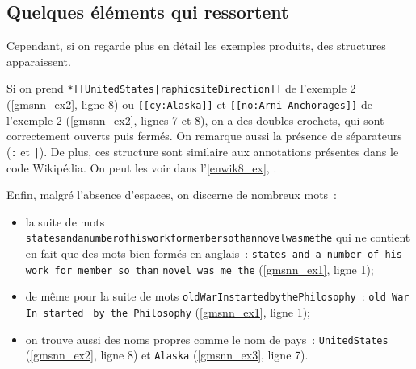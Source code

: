 \subsection{Quelques éléments qui ressortent}
Cependant, si on regarde plus en détail les exemples produits, des structures apparaissent. 

Si on prend \lstinline!*[[UnitedStates|raphicsiteDirection]]! de l'exemple 2 (\autoref{gmsnn_ex2}, ligne 8) ou 
\lstinline![[cy:Alaska]]! et \lstinline![[no:Arni-Anchorages]]! de l'exemple 2 (\autoref{gmsnn_ex2}, lignes 7 et 8), on a des doubles crochets, qui sont correctement ouverts puis fermés. On remarque aussi la présence de séparateurs (\lstinline!:! et \lstinline!|!). De plus, ces structure sont similaire aux annotations présentes dans le code Wikipédia.
On peut les voir dans l'\autoref{enwik8_ex}, .

Enfin, malgré l'absence d'espaces, on discerne de nombreux mots~:
\begin{itemize}
	\item la suite de mots \lstinline!statesandanumberofhisworkformembersothannovelwasmethe! qui ne contient en fait que des mots bien formés en anglais~: \lstinline!states and a number of his work for member so than! \lstinline!novel was me the! (\autoref{gmsnn_ex1}, ligne 1);
	\item de même pour la suite de mots \lstinline!oldWarInstartedbythePhilosophy!~: \lstinline!old War In started! \lstinline! by the Philosophy!
	(\autoref{gmsnn_ex1}, ligne 1);
	\item on trouve aussi des noms propres comme le nom de pays~: \lstinline!UnitedStates! (\autoref{gmsnn_ex2}, ligne 8) et \lstinline!Alaska! (\autoref{gmsnn_ex3}, ligne 7).
\end{itemize}